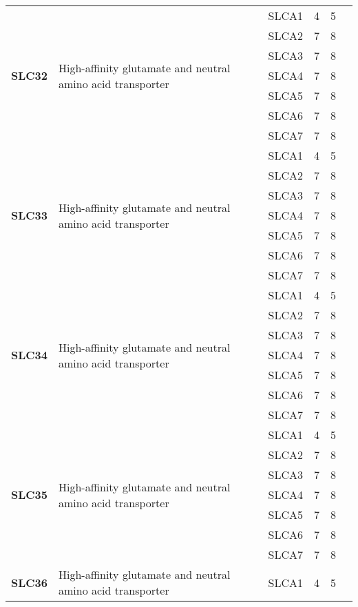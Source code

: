 \documentclass[12pt]{report}
\begin{document}
\begin{center}
\begin{longtable}{|p{1.5cm}|p{3.2cm}|p{1.9cm}|p{1.65cm}|p{3cm}|p{3cm}|}
\hline
\multirow{7}{1.5cm}{\textbf{SLC32}} & \multirow{7}{4cm}{High-affinity glutamate and neutral amino acid transporter} & SLCA1 & 4 & 5\\ 
\cline{3-6}
&&SLCA2&7 & 8&\\ 
\cline{3-6}
&&SLCA3&7 & 8&\\ 
\cline{3-6}
&&SLCA4&7 & 8&\\ 
\cline{3-6}
&&SLCA5&7 & 8&\\ 
\cline{3-6}
&&SLCA6&7 & 8&\\ 
\cline{3-6}
&&SLCA7&7 & 8&\\ 
\hline
\multirow{7}{1.5cm}{\textbf{SLC33}} & \multirow{7}{4cm}{High-affinity glutamate and neutral amino acid transporter} & SLCA1 & 4 & 5\\ 
\cline{3-6}
&&SLCA2&7 & 8&\\ 
\cline{3-6}
&&SLCA3&7 & 8&\\ 
\cline{3-6}
&&SLCA4&7 & 8&\\ 
\cline{3-6}
&&SLCA5&7 & 8&\\ 
\cline{3-6}
&&SLCA6&7 & 8&\\ 
\cline{3-6}
&&SLCA7&7 & 8&\\ 
\hline
\multirow{7}{1.5cm}{\textbf{SLC34}} & \multirow{7}{4cm}{High-affinity glutamate and neutral amino acid transporter} & SLCA1 & 4 & 5\\ 
\cline{3-6}
&&SLCA2&7 & 8&\\ 
\cline{3-6}
&&SLCA3&7 & 8&\\ 
\cline{3-6}
&&SLCA4&7 & 8&\\ 
\cline{3-6}
&&SLCA5&7 & 8&\\ 
\cline{3-6}
&&SLCA6&7 & 8&\\ 
\cline{3-6}
&&SLCA7&7 & 8&\\ 
\hline
\multirow{7}{1.5cm}{\textbf{SLC35}} & \multirow{7}{4cm}{High-affinity glutamate and neutral amino acid transporter} & SLCA1 & 4 & 5\\ 
\cline{3-6}
&&SLCA2&7 & 8&\\ 
\cline{3-6}
&&SLCA3&7 & 8&\\ 
\cline{3-6}
&&SLCA4&7 & 8&\\ 
\cline{3-6}
&&SLCA5&7 & 8&\\ 
\cline{3-6}
&&SLCA6&7 & 8&\\ 
\cline{3-6}
&&SLCA7&7 & 8&\\ 
\hline
\multirow{7}{1.5cm}{\textbf{SLC36}} & \multirow{7}{4cm}{High-affinity glutamate and neutral amino acid transporter} & SLCA1 & 4 & 5\\ 

\end{longtable}
\end{center}
\end{document}
